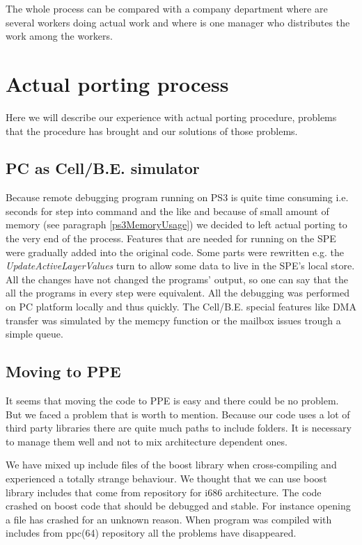 \par
The whole process can be compared with a company department where are several workers doing actual work and where is one manager who distributes the work among the workers.

\section{Actual porting process}

\par
Here we will describe our experience with actual porting procedure, problems that the procedure has brought and our solutions of those problems.

\subsection{PC as \mbox{Cell/B.E.} simulator}

\par
Because remote debugging program running on PS3 is quite time consuming i.e. seconds for step into command and the like and because of small amount of memory (see paragraph \ref{ps3MemoryUsage}) we decided to left actual porting to the very end of the process.
Features that are needed for running on the SPE were gradually added into the original code.
Some parts were rewritten e.g. the \emph{UpdateActiveLayerValues} turn to allow some data to live in the SPE's local store.
All the changes have not changed the programs' output, so one can say that the all the programs in every step were equivalent.
All the debugging was performed on PC platform locally and thus quickly.
The \mbox{Cell/B.E.} special features like DMA transfer was simulated by the memcpy function or the mailbox issues trough a simple queue.

\subsection{Moving to PPE}

\par
It seems that moving the code to PPE is easy and there could be no problem.
But we faced a problem that is worth to mention.
Because our code uses a lot of third party libraries there are quite much paths to include folders.
It is necessary to manage them well and not to mix architecture dependent ones.

\par
We have mixed up include files of the boost library when cross-compiling and experienced a totally strange behaviour.
We thought that we can use boost library includes that come from repository for i686 architecture.
The code crashed on boost code that should be debugged and stable.
For instance opening a file has crashed for an unknown reason.
When program was compiled with includes from ppc(64) repository all the problems have disappeared.

